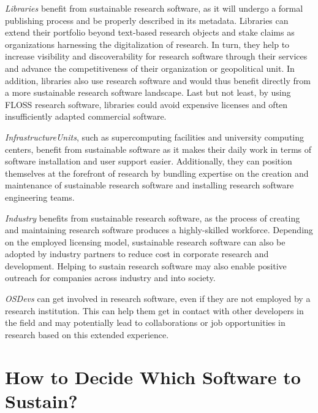\documentclass[a4paper,num-refs,numbers,sort&compress]{de-rse}
\begin{document}
\textit{\Gls{Libraries}} benefit from sustainable research software, as it will undergo a formal publishing process and be properly described in its metadata. Libraries can extend their portfolio beyond text-based research objects and stake claims as organizations harnessing the digitalization of research. In turn, they help to increase visibility and discoverability for research software through their services and advance the competitiveness of their organization or geopolitical unit. In addition, libraries also use research software and would thus benefit directly from a more sustainable research software landscape. Last but not least, by using FLOSS research software, libraries could avoid expensive licenses and often insufficiently adapted commercial software.

\textit{\Gls{InfrastructureUnits}}, such as supercomputing facilities and
university computing centers, benefit from sustainable software as it makes their daily work in terms of software installation and user support easier. Additionally, they can position themselves at the forefront of research by bundling expertise on the creation and maintenance of sustainable research software and installing research software engineering teams.

\textit{\Gls{Industry}} benefits from sustainable research software, as the
process of creating and maintaining research software produces a highly-skilled workforce.
Depending on the employed licensing model, sustainable research software can also be adopted by industry partners to reduce cost in corporate research and development.
Helping to sustain research software may also enable positive outreach for companies across industry and into society.

\textit{\Gls{OSDevs}} can get involved in research software, even if they 
are not employed by a research institution. This can help them get in contact with
other developers in the field and may potentially lead to collaborations or job opportunities in research based on this extended experience.

\section{How to Decide Which Software to Sustain?}
\label{sec:selection}

\end{document}
